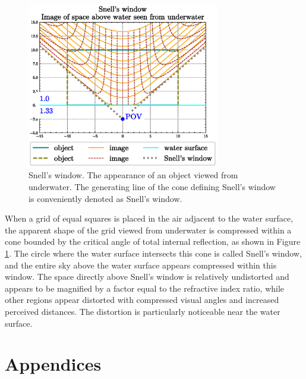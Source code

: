 \documentclass[twocolumn]{article}
\begin{document}
\begin{figure}[!h]
	\centering
	\includegraphics[width=3.3in]{figs/snell_window.eps}
	\caption{Snell's window. The appearance of an object viewed from underwater. The generating line of the cone defining Snell's window is conveniently denoted as Snell's window.}
	\label{fig:snell_window}
\end{figure}

When a grid of equal squares is placed in the air adjacent to the water surface, the apparent shape of the grid viewed from underwater is compressed within a cone bounded by the critical angle of total internal reflection, as shown in Figure \ref{fig:snell_window}. The circle where the water surface intersects this cone is called Snell's window, and the entire sky above the water surface appears compressed within this window. The space directly above Snell's window is relatively undistorted and appears to be magnified by a factor equal to the refractive index ratio, while other regions appear distorted with compressed visual angles and increased perceived distances. The distortion is particularly noticeable near the water surface.



\appendix
\section*{Appendices}
\end{document}
